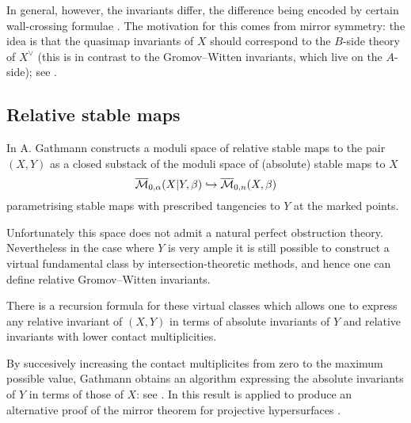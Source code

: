 In general, however, the invariants differ, the difference being encoded by certain wall-crossing formulae \cite{CF-K-wallcrossing}. The motivation for this comes from mirror symmetry: the idea is that the quasimap invariants of $X$ should correspond to the $B$-side theory of $X^\vee$ (this is in contrast to the Gromov--Witten invariants, which live on the $A$-side); see \cite[\S 7]{CF-K}.


\subsection{Relative stable maps}
In \cite{Ga} A. Gathmann constructs a moduli space of relative stable maps to the pair $(X,Y)$ as a closed substack of the moduli space of (absolute) stable maps to $X$
\begin{equation*} \overline{\mathcal M}_{0,\alpha}(X|Y,\beta) \hookrightarrow \overline{\mathcal M}_{0,n}(X,\beta) \end{equation*}
parametrising stable maps with prescribed tangencies to $Y$ at the marked points.

Unfortunately this space does not admit a natural perfect obstruction theory. Nevertheless in the case where $Y$ is very ample it is still possible to construct a virtual fundamental class by intersection-theoretic methods, and hence one can define relative Gromov--Witten invariants.

There is a recursion formula for these virtual classes which allows one to express any relative invariant of $(X,Y)$ in terms of absolute invariants of $Y$ and relative invariants with lower contact multiplicities. 


By succesively increasing the contact multiplicites from zero to the maximum possible value, Gathmann obtains an algorithm expressing the absolute invariants of $Y$ in terms of those of $X$: see \cite[Corollary 5.7]{Ga}. In \cite{Ga-MF} this result is applied to produce an alternative proof of the mirror theorem for projective hypersurfaces \cite{Giv} \cite{LLY}.

